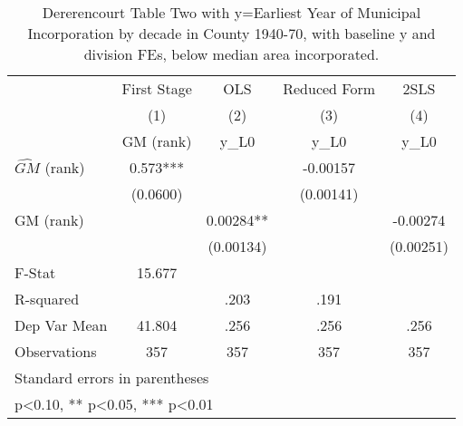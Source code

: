 \begin{table}[htbp]\centering
\def\sym#1{\ifmmode^{#1}\else\(^{#1}\)\fi}
\caption{Dererencourt Table Two with y=Earliest Year of Municipal Incorporation by decade in County 1940-70, with baseline y and division FEs, below median area incorporated.}
\begin{tabular}{l*{4}{c}}
\toprule
                    & First Stage   &         OLS   &Reduced Form   &        2SLS   \\
                    &\multicolumn{1}{c}{(1)}&\multicolumn{1}{c}{(2)}&\multicolumn{1}{c}{(3)}&\multicolumn{1}{c}{(4)}\\
                    &\multicolumn{1}{c}{GM  (rank)}&\multicolumn{1}{c}{y\_L0}&\multicolumn{1}{c}{y\_L0}&\multicolumn{1}{c}{y\_L0}\\
\midrule
$\hat{GM}$ (rank)   &       0.573***&               &    -0.00157   &               \\
                    &    (0.0600)   &               &   (0.00141)   &               \\
\addlinespace
GM  (rank)          &               &     0.00284** &               &    -0.00274   \\
                    &               &   (0.00134)   &               &   (0.00251)   \\
\midrule
F-Stat              &      15.677   &               &               &               \\
R-squared           &               &        .203   &        .191   &               \\
Dep Var Mean        &      41.804   &        .256   &        .256   &        .256   \\
Observations        &         357   &         357   &         357   &         357   \\
\bottomrule
\multicolumn{5}{l}{\footnotesize Standard errors in parentheses}\\
\multicolumn{5}{l}{\footnotesize * p<0.10, ** p<0.05, *** p<0.01}\\
\end{tabular}
\end{table}
